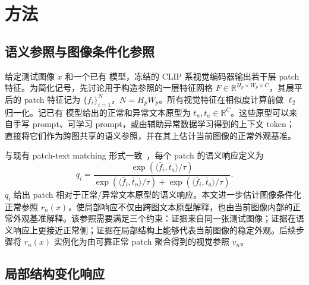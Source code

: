 \section{方法}
\label{sec:method}

\subsection{语义参照与图像条件化参照}

给定测试图像 $x$ 和一个已有 \clipzsad{} 模型，冻结的 CLIP 系视觉编码器输出若干层 patch 特征。为简化记号，先讨论用于构造参照的一层特征网格
$F\in\mathbb{R}^{H_p\times W_p\times C}$，其展平后的 patch 特征记为
$\{f_i\}_{i=1}^{N}$，$N=H_pW_p$。所有视觉特征在相似度计算前做 $\ell_2$ 归一化。记已有 \clipzsad{} 模型给出的正常和异常文本原型为
$t_n,t_a\in\mathbb{R}^{C}$。这些原型可以来自手写 prompt、可学习 prompt，或由辅助异常数据学习得到的上下文 token；\method{} 直接将它们作为跨图共享的语义参照，并在其上估计当前图像的正常外观基准。

与现有 patch-text matching 形式一致~\cite{radford2021clip,jeong2023winclip,zhou2024anomalyclip}，每个 patch 的语义响应定义为
\begin{equation}
  q_i =
  \frac{\exp(\langle \bar f_i,\bar t_a\rangle/\tau)}
       {\exp(\langle \bar f_i,\bar t_n\rangle/\tau)+
        \exp(\langle \bar f_i,\bar t_a\rangle/\tau)} .
  \label{eq:semantic-response}
\end{equation}
$q_i$ 给出 patch 相对于正常/异常文本原型的语义响应。本文进一步估计图像条件化正常参照
$r_n(x)$，使局部响应不仅由跨图文本原型解释，也由当前图像内部的正常外观基准解释。该参照需要满足三个约束：证据来自同一张测试图像；证据在语义响应上更接近正常侧；证据在局部结构上能够代表当前图像的稳定外观。后续步骤将 $r_n(x)$ 实例化为由可靠正常 patch 聚合得到的视觉参照 $v_n$。

\subsection{局部结构变化响应}

